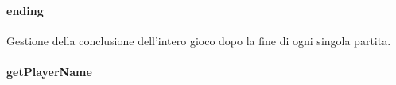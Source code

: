 \documentclass[letterpaper,10pt,italian,openany,oneside]{sphinxmanual}
\begin{document}
\paragraph{ending}
\label{\detokenize{source/it/unicam/cs/pa/mastermind/ui/StartView:ending}}

\begin{fulllineitems}
\label{\detokenize{source/it/unicam/cs/pa/mastermind/ui/StartView:it.unicam.cs.pa.mastermind.ui.StartView.ending()}}
Gestione della conclusione dell’intero gioco dopo la fine di ogni singola partita.

\end{fulllineitems}



\paragraph{getPlayerName}
\label{\detokenize{source/it/unicam/cs/pa/mastermind/ui/StartView:getplayername}}
\end{document}
